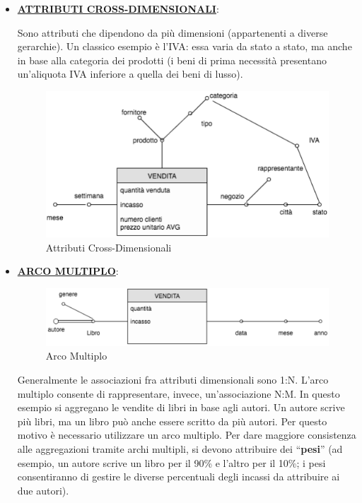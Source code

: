 \begin{itemize}

\item{\underline{\textbf{ATTRIBUTI CROSS-DIMENSIONALI}}}:

Sono attributi che dipendono da più dimensioni (appartenenti a diverse gerarchie). Un classico esempio è l’IVA: essa varia da stato a stato, ma anche in base alla categoria dei prodotti (i beni di prima necessità presentano un’aliquota IVA inferiore a quella dei beni di lusso).  
 
\begin{center}
\begin{figure}[H]
\centering
\includegraphics[scale=1]{figures/cda.png}
\caption{Attributi Cross-Dimensionali}
\end{figure}
\end{center}

\item{\underline{\textbf{ARCO MULTIPLO}}}:

\begin{center}
\begin{figure}[H]
\centering
\includegraphics[scale=1]{figures/ma.png}
\caption{Arco Multiplo}
\end{figure}
\end{center}

Generalmente le associazioni fra attributi dimensionali sono 1:N. L’arco multiplo consente di rappresentare, invece, un’associazione N:M.  In questo esempio si aggregano le vendite di libri in base agli autori. Un autore scrive più libri, ma un libro può anche essere scritto da più autori. Per questo motivo è necessario utilizzare un arco multiplo. Per dare maggiore consistenza alle aggregazioni tramite archi multipli, si devono attribuire dei “\textbf{pesi}” (ad esempio, un autore scrive un libro per il 90\% e l’altro per il 10\%; i pesi consentiranno di gestire le diverse percentuali degli incassi da attribuire ai due autori). 


\end{itemize}
